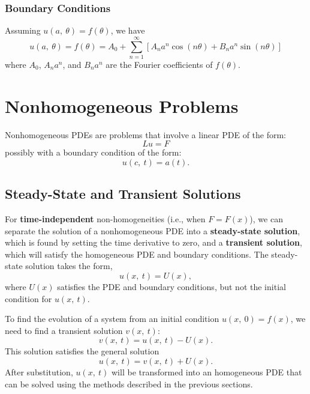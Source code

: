 \documentclass{article}
\begin{document}
\subsubsection{Boundary Conditions}
Assuming \(u\left( a,\: \theta \right) = f\left( \theta \right)\), we
have
\begin{equation*}
    u\left( a,\: \theta \right) = f\left( \theta \right) = A_0 + \sum_{n = 1}^\infty \left[ A_n a^n \cos{\left( n \theta \right)} + B_n a^n \sin{\left( n \theta \right)} \right]
\end{equation*}
where \(A_0\), \(A_n a^n\), and \(B_n a^n\) are the Fourier coefficients of \(f\left( \theta \right)\).
\section{Nonhomogeneous Problems}
Nonhomogeneous PDEs are problems that involve a linear PDE of the form:
\begin{equation*}
    L u = F
\end{equation*}
possibly with a boundary condition of the form:
\begin{equation*}
    u\left( c,\: t \right) = a\left( t \right).
\end{equation*}
\subsection{Steady-State and Transient Solutions}
For \textbf{time-independent} non-homogeneities (i.e., when \(F =
F\left( x \right)\)), we can separate the solution of a nonhomogeneous
PDE into a \textbf{steady-state solution}, which is found by setting
the time derivative to zero, and a \textbf{transient solution}, which
will satisfy the homogeneous PDE and boundary conditions. The
steady-state solution takes the form,
\begin{equation*}
    u\left( x,\: t \right) = U\left( x \right),
\end{equation*}
where \(U\left( x \right)\) satisfies the PDE and boundary conditions, but not the initial condition for \(u\left( x,\: t \right)\).

To find the evolution of a system from an initial condition \(u\left(
x,\: 0 \right) = f\left( x \right)\), we need to find a transient
solution \(v\left( x,\: t \right)\):
\begin{equation*}
    v\left( x,\: t \right) = u\left( x,\: t \right) - U\left( x \right).
\end{equation*}
This solution satisfies the general solution
\begin{equation*}
    u\left( x,\: t \right) = v\left( x,\: t \right) + U\left( x \right).
\end{equation*}
After substitution, \(u\left( x,\: t \right)\) will be transformed into an homogeneous PDE that
can be solved using the methods described in the previous sections.
\end{document}
